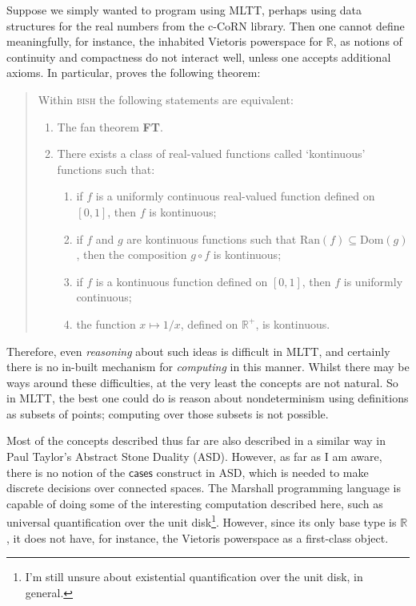 \documentclass{article}           %
\newcommand{\R}{\mathbb{R}}
\begin{document}
Suppose we simply wanted to program using MLTT, perhaps using data structures for the real numbers from the c-CoRN library. Then one cannot define meaningfully, for instance, the inhabited Vietoris powerspace for $\R$, as notions of continuity and compactness do not interact well, unless one accepts additional axioms. In particular, \cite{waaldijk} proves the following theorem:
\begin{quote}
Within \textsc{bish} the following statements are equivalent:
\begin{enumerate}
\item The fan theorem \textbf{FT}.
\item There exists a class of real-valued functions called `kontinuous' functions such that:
\begin{enumerate}
\item if $f$ is a uniformly continuous real-valued function defined on $[0, 1]$, then $f$ is kontinuous;
\item if $f$ and $g$ are kontinuous functions such that $\text{Ran}(f) \subseteq \text{Dom}(g)$, then the composition $g \circ f$ is kontinuous;
\item if $f$ is a kontinuous function defined on $[0, 1]$, then $f$ is
uniformly continuous;
\item the function $x \mapsto 1/x$, defined on $\R^+$, is kontinuous.
\end{enumerate}
\end{enumerate}
\end{quote}

Therefore, even \emph{reasoning} about such ideas is difficult in MLTT, and certainly there is no in-built mechanism for \emph{computing} in this manner. Whilst there may be ways around these difficulties, at the very least the concepts are not natural. So in MLTT, the best one could do is reason about nondeterminism using definitions as subsets of points; computing over those subsets is not possible.

Most of the concepts described thus far are also described in a similar way in Paul Taylor's Abstract Stone Duality (ASD). However, as far as I am aware, there is no notion of the $\mathsf{cases}$ construct in ASD, which is needed to make discrete decisions over connected spaces. The Marshall programming language is capable of doing some of the interesting computation described here, such as universal quantification over the unit disk\footnote{I'm still unsure about existential quantification over the unit disk, in general.}. However, since its only base type is $\R$, it does not have, for instance, the Vietoris powerspace as a first-class object.
\end{document}
